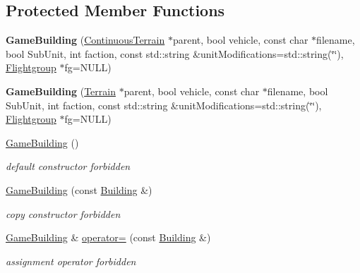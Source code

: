 \subsection*{Protected Member Functions}
\begin{DoxyCompactItemize}
\item 
{\bfseries Game\+Building} (\hyperlink{classContinuousTerrain}{Continuous\+Terrain} $\ast$parent, bool vehicle, const char $\ast$filename, bool Sub\+Unit, int faction, const std\+::string \&unit\+Modifications=std\+::string(\char`\"{}\char`\"{}), \hyperlink{classFlightgroup}{Flightgroup} $\ast$fg=N\+U\+LL)\hypertarget{classGameBuilding_a7db26f5eb02c970c93759d16eb2d96db}{}\label{classGameBuilding_a7db26f5eb02c970c93759d16eb2d96db}

\item 
{\bfseries Game\+Building} (\hyperlink{classTerrain}{Terrain} $\ast$parent, bool vehicle, const char $\ast$filename, bool Sub\+Unit, int faction, const std\+::string \&unit\+Modifications=std\+::string(\char`\"{}\char`\"{}), \hyperlink{classFlightgroup}{Flightgroup} $\ast$fg=N\+U\+LL)\hypertarget{classGameBuilding_a18ae0cbbceb986ff6814f81973276693}{}\label{classGameBuilding_a18ae0cbbceb986ff6814f81973276693}

\item 
\hyperlink{classGameBuilding_a8340c9b640c90ecd757b713e8ca110ed}{Game\+Building} ()\hypertarget{classGameBuilding_a8340c9b640c90ecd757b713e8ca110ed}{}\label{classGameBuilding_a8340c9b640c90ecd757b713e8ca110ed}

\begin{DoxyCompactList}\small\item\em default constructor forbidden \end{DoxyCompactList}\item 
\hyperlink{classGameBuilding_ac4642b0e05ad56e639aa9178f3b437bc}{Game\+Building} (const \hyperlink{classBuilding}{Building} \&)\hypertarget{classGameBuilding_ac4642b0e05ad56e639aa9178f3b437bc}{}\label{classGameBuilding_ac4642b0e05ad56e639aa9178f3b437bc}

\begin{DoxyCompactList}\small\item\em copy constructor forbidden \end{DoxyCompactList}\item 
\hyperlink{classGameBuilding}{Game\+Building} \& \hyperlink{classGameBuilding_a1e427732e0bb577d631803c04c912aca}{operator=} (const \hyperlink{classBuilding}{Building} \&)\hypertarget{classGameBuilding_a1e427732e0bb577d631803c04c912aca}{}\label{classGameBuilding_a1e427732e0bb577d631803c04c912aca}

\begin{DoxyCompactList}\small\item\em assignment operator forbidden \end{DoxyCompactList}\end{DoxyCompactItemize}
